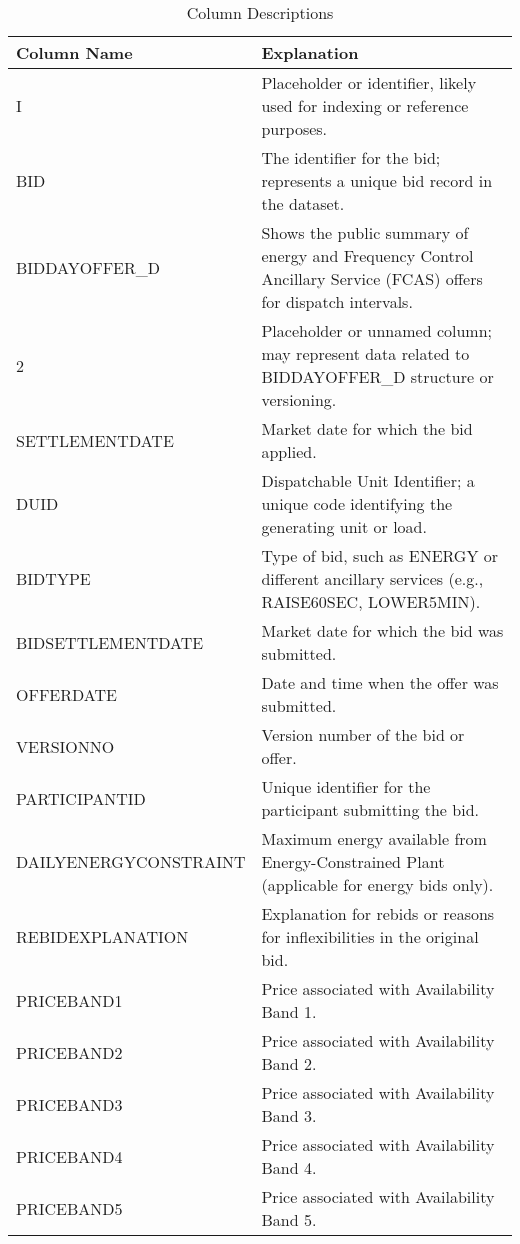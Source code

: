 \documentclass{article}
\begin{document}
\begin{table}[ht]
\centering
\caption{Column Descriptions}
\label{tab:column_descriptions}
\begin{tabularx}{\textwidth}{|l|X|}
\hline
\textbf{Column Name} & \textbf{Explanation} \\
\hline
I & Placeholder or identifier, likely used for indexing or reference purposes. \\
\hline
BID & The identifier for the bid; represents a unique bid record in the dataset. \\
\hline
BIDDAYOFFER\_D & Shows the public summary of energy and Frequency Control Ancillary Service (FCAS) offers for dispatch intervals. \\
\hline
2 & Placeholder or unnamed column; may represent data related to BIDDAYOFFER\_D structure or versioning. \\
\hline
SETTLEMENTDATE & Market date for which the bid applied. \\
\hline
DUID & Dispatchable Unit Identifier; a unique code identifying the generating unit or load. \\
\hline
BIDTYPE & Type of bid, such as ENERGY or different ancillary services (e.g., RAISE60SEC, LOWER5MIN). \\
\hline
BIDSETTLEMENTDATE & Market date for which the bid was submitted. \\
\hline
OFFERDATE & Date and time when the offer was submitted. \\
\hline
VERSIONNO & Version number of the bid or offer. \\
\hline
PARTICIPANTID & Unique identifier for the participant submitting the bid. \\
\hline
DAILYENERGYCONSTRAINT & Maximum energy available from Energy-Constrained Plant (applicable for energy bids only). \\
\hline
REBIDEXPLANATION & Explanation for rebids or reasons for inflexibilities in the original bid. \\
\hline
PRICEBAND1 & Price associated with Availability Band 1. \\
\hline
PRICEBAND2 & Price associated with Availability Band 2. \\
\hline
PRICEBAND3 & Price associated with Availability Band 3. \\
\hline
PRICEBAND4 & Price associated with Availability Band 4. \\
\hline
PRICEBAND5 & Price associated with Availability Band 5. \\
\hline

\end{tabularx}
\end{table}
\end{document}
